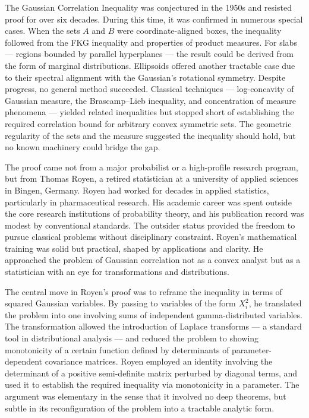 The Gaussian Correlation Inequality was conjectured in the 1950s and resisted proof for over six decades. During this time, it was confirmed in numerous special cases. When the sets \( A \) and \( B \) were coordinate-aligned boxes, the inequality followed from the FKG inequality and properties of product measures. For slabs — regions bounded by parallel hyperplanes — the result could be derived from the form of marginal distributions. Ellipsoids offered another tractable case due to their spectral alignment with the Gaussian's rotational symmetry. Despite progress, no general method succeeded. Classical techniques — log-concavity of Gaussian measure, the Brascamp–Lieb inequality, and concentration of measure phenomena — yielded related inequalities but stopped short of establishing the required correlation bound for arbitrary convex symmetric sets. The geometric regularity of the sets and the measure suggested the inequality should hold, but no known machinery could bridge the gap.

The proof came not from a major probabilist or a high-profile research program, but from Thomas Royen, a retired statistician at a university of applied sciences in Bingen, Germany. Royen had worked for decades in applied statistics, particularly in pharmaceutical research. His academic career was spent outside the core research institutions of probability theory, and his publication record was modest by conventional standards. The outsider status provided the freedom to pursue classical problems without disciplinary constraint. Royen's mathematical training was solid but practical, shaped by applications and clarity. He approached the problem of Gaussian correlation not as a convex analyst but as a statistician with an eye for transformations and distributions.

The central move in Royen's proof was to reframe the inequality in terms of squared Gaussian variables. By passing to variables of the form \( X_i^2 \), he translated the problem into one involving sums of independent gamma-distributed variables. The transformation allowed the introduction of Laplace transforms — a standard tool in distributional analysis — and reduced the problem to showing monotonicity of a certain function defined by determinants of parameter-dependent covariance matrices. Royen employed an identity involving the determinant of a positive semi-definite matrix perturbed by diagonal terms, and used it to establish the required inequality via monotonicity in a parameter. The argument was elementary in the sense that it involved no deep theorems, but subtle in its reconfiguration of the problem into a tractable analytic form.

